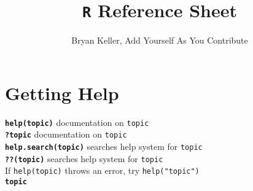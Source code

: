 \documentclass{article}
\title{\texttt{R} Reference Sheet}
\author{Bryan Keller, Add Yourself As You Contribute}
\newcommand{\fn}[1]{\textbf{\texttt{#1}}}
\newcommand{\ttt}[1]{\texttt{#1}}
\begin{document}
\maketitle

\section{Getting Help}
\fn{help(topic)} documentation on \ttt{topic} \\
\fn{?topic} documentation on \ttt{topic} \\
\fn{help.search(topic)} searches help system for \ttt{topic} \\
\fn{??(topic)} searches help system for \ttt{topic} \\
If \ttt{help(topic)} throws an error, try \ttt{help("topic")} \\
\tt{\textbf{topic}}
\end{document}

